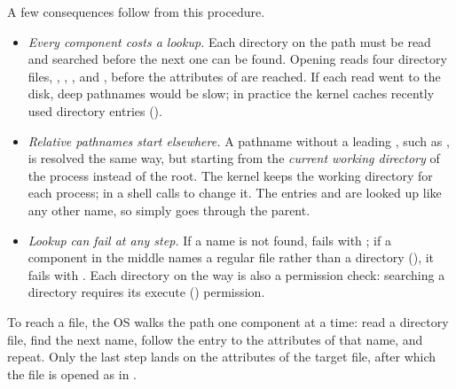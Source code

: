 A few consequences follow from this procedure.
\begin{itemize}
  \item \emph{Every component costs a lookup.} Each directory on the path must be read and searched before the next one can be found. Opening  reads four directory files, \code{/}, , , and , before the attributes of  are reached. If each read went to the disk, deep pathnames would be slow; in practice the kernel caches recently used directory entries ().
  \item \emph{Relative pathnames start elsewhere.} A pathname without a leading \code{/}, such as , is resolved the same way, but starting from the \emph{current working directory} of the process instead of the root. The kernel keeps the working directory for each process;  in a shell calls  to change it. The entries  and  are looked up like any other name, so  simply goes through the parent.
  \item \emph{Lookup can fail at any step.} If a name is not found,  fails with ; if a component in the middle names a regular file rather than a directory (), it fails with . Each directory on the way is also a permission check: searching a directory requires its execute () permission.
\end{itemize}

\begin{keypoint}
  To reach a file, the OS walks the path one component at a time: read a directory file, find the next name, follow the entry to the attributes of that name, and repeat. Only the last step lands on the attributes of the target file, after which the file is opened as in .
\end{keypoint}

